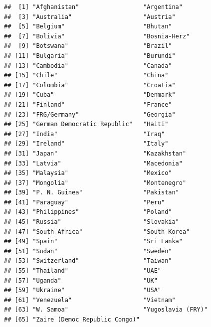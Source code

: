 \documentclass[
]{article}
\newenvironment{Shaded}{\begin{snugshade}}{\end{snugshade}}
\newcommand{\CommentTok}[1]{\textcolor[rgb]{0.56,0.35,0.01}{\textit{#1}}}
\newcommand{\DecValTok}[1]{\textcolor[rgb]{0.00,0.00,0.81}{#1}}
\newcommand{\KeywordTok}[1]{\textcolor[rgb]{0.13,0.29,0.53}{\textbf{#1}}}
\newcommand{\NormalTok}[1]{#1}
\newcommand{\OperatorTok}[1]{\textcolor[rgb]{0.81,0.36,0.00}{\textbf{#1}}}
\newcommand{\StringTok}[1]{\textcolor[rgb]{0.31,0.60,0.02}{#1}}
\begin{document}
\begin{Shaded}
\end{Shaded}

\begin{verbatim}
##  [1] "Afghanistan"                  "Argentina"                   
##  [3] "Australia"                    "Austria"                     
##  [5] "Belgium"                      "Bhutan"                      
##  [7] "Bolivia"                      "Bosnia-Herz"                 
##  [9] "Botswana"                     "Brazil"                      
## [11] "Bulgaria"                     "Burundi"                     
## [13] "Cambodia"                     "Canada"                      
## [15] "Chile"                        "China"                       
## [17] "Colombia"                     "Croatia"                     
## [19] "Cuba"                         "Denmark"                     
## [21] "Finland"                      "France"                      
## [23] "FRG/Germany"                  "Georgia"                     
## [25] "German Democratic Republic"   "Haiti"                       
## [27] "India"                        "Iraq"                        
## [29] "Ireland"                      "Italy"                       
## [31] "Japan"                        "Kazakhstan"                  
## [33] "Latvia"                       "Macedonia"                   
## [35] "Malaysia"                     "Mexico"                      
## [37] "Mongolia"                     "Montenegro"                  
## [39] "P. N. Guinea"                 "Pakistan"                    
## [41] "Paraguay"                     "Peru"                        
## [43] "Philippines"                  "Poland"                      
## [45] "Russia"                       "Slovakia"                    
## [47] "South Africa"                 "South Korea"                 
## [49] "Spain"                        "Sri Lanka"                   
## [51] "Sudan"                        "Sweden"                      
## [53] "Switzerland"                  "Taiwan"                      
## [55] "Thailand"                     "UAE"                         
## [57] "Uganda"                       "UK"                          
## [59] "Ukraine"                      "USA"                         
## [61] "Venezuela"                    "Vietnam"                     
## [63] "W. Samoa"                     "Yugoslavia (FRY)"            
## [65] "Zaire (Democ Republic Congo)"
\end{verbatim}
\end{document}
